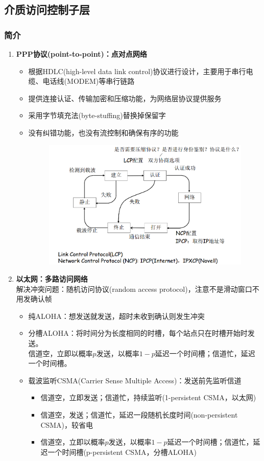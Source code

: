 \subsection{介质访问控制子层}
\subsubsection{简介}
\begin{enumerate}
\item \textbf{PPP协议(point-to-point)：点对点网络}
\begin{itemize}
	\item 根据HDLC(high-level data link control)协议进行设计，主要用于串行电缆、电话线(MODEM)等串行链路
	\item 提供连接认证、传输加密和压缩功能，为网络层协议提供服务
	\item 采用字节填充法(byte-stuffing)替换掉保留字
	\item 没有纠错功能，也没有流控制和确保有序的功能
	\begin{figure}[H]
		\centering
		\includegraphics[width=0.6\linewidth]{fig/PPP.PNG}
	\end{figure}
\end{itemize}

\item \textbf{以太网：多路访问网络}\\
解决冲突问题：随机访问协议(random access protocol)，注意不是滑动窗口不用发确认帧
\begin{itemize}
\item 纯ALOHA：想发送就发送，超时未收到确认则发生冲突
\item 分槽ALOHA：将时间分为长度相同的时槽，每个站点只在时槽开始时发送。\\
信道空，立即以概率$p$发送，以概率$1-p$延迟一个时间槽；信道忙，延迟一个时间槽。
\item 载波监听CSMA(Carrier Sense Multiple Access)：发送前先监听信道
\begin{itemize}
	\item 信道空，立即发送；信道忙，持续监听(1-persistent CSMA，以太网)
	\item 信道空，发送；信道忙，延迟一段随机长度时间(non-persistent CSMA)，较省电
	\item 信道空，立即以概率$p$发送，以概率$1-p$延迟一个时间槽；信道忙，延迟一个时间槽(p-persistent CSMA，分槽ALOHA)
\end{itemize}
\end{itemize}
\end{enumerate}

